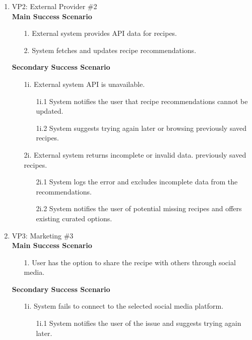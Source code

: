 \documentclass{article}
\begin{document}
\begin{enumerate}[{\bf BE1.}]
\begin{enumerate}[{\bf VP1.}]
			\item VP2: External Provider \#2 \\
				\textbf{Main Success Scenario} 
			\begin{enumerate}
				\item[1.] External system provides API data for recipes.
				\item[2.] System fetches and updates recipe recommendations.
			\end{enumerate}
			 \textbf{Secondary Success Scenario}
			  \begin{enumerate}
				\item[1i.] External system API is unavailable.
					\begin{enumerate}
						 \item[1i.1] System notifies the user that recipe recommendations cannot be updated.
						 \item [1i.2] System suggests trying again later or browsing previously saved recipes.
					\end{enumerate}
					\item[2i.] External system returns incomplete or invalid data. previously saved recipes.
					\begin{enumerate}
						 \item[2i.1] System logs the error and excludes incomplete data from the recommendations.
						 \item[2i.2] System notifies the user of potential missing recipes and offers existing curated options.
					\end{enumerate}
			\end{enumerate}
			
			\item VP3: Marketing \#3 \\ 
				\textbf{Main Success Scenario} 
			\begin{enumerate}
				\item[1.] User has the option to share the recipe with others through social media.
			\end{enumerate}
				\textbf{Secondary Success Scenario}
				\begin{enumerate}
				\item[1i.] System fails to connect to the selected social media platform.
					\begin{enumerate}
						 \item[1i.1] System notifies the user of the issue and suggests trying again later.
					\end{enumerate}
				\end{enumerate}
				

\end{enumerate}
\end{enumerate}
\end{document}
